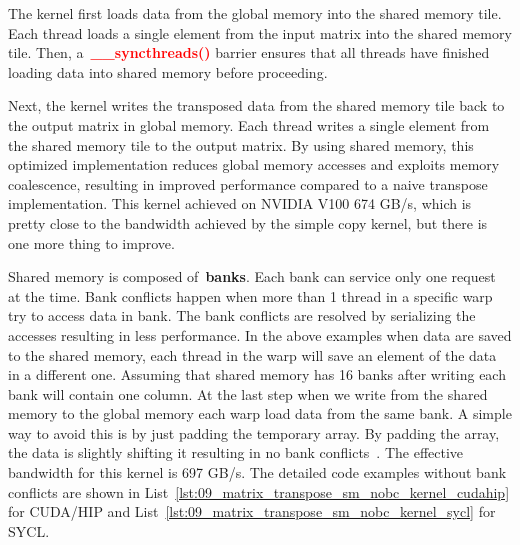 \par
The kernel first loads data from the global memory into the shared memory tile.
Each thread loads a single element from the input matrix into the shared memory tile.
Then, a~\textbf{\textcolor{red}{\_\_syncthreads()}} barrier ensures that all threads have finished loading data into shared memory before proceeding.


\par
Next, the kernel writes the transposed data from the shared memory tile back to the output matrix in global memory.
Each thread writes a single element from the shared memory tile to the output matrix.
By using shared memory, this optimized implementation reduces global memory accesses and exploits memory coalescence, resulting in improved performance compared to a naive transpose implementation.
This kernel achieved on NVIDIA V100 674 GB/s, which is pretty close to the bandwidth achieved by the simple copy kernel, but there is one more thing to improve.


\par
Shared memory is composed of~\textbf{banks}.
Each bank can service only one request at the time.
Bank conflicts happen when more than 1 thread in a specific warp try to access data in bank.
The bank conflicts are resolved by serializing the accesses resulting in less performance.
In the above examples when data are saved to the shared memory, each thread in the warp will save an element of the data in a different one.
Assuming that shared memory has 16 banks after writing each bank will contain one column.
At the last step when we write from the shared memory to the global memory each warp load data from the same bank.
A simple way to avoid this is by just padding the temporary array.
By padding the array, the data is slightly shifting it resulting in no bank conflicts~\cite{matrix_transpose_efficient, matrix_transpose_advanced}.
The effective bandwidth for this kernel is 697 GB/s.
The detailed code examples without bank conflicts are shown in List~\ref{lst:09_matrix_transpose_sm_nobc_kernel_cudahip} for CUDA/HIP and List~\ref{lst:09_matrix_transpose_sm_nobc_kernel_sycl} for SYCL.








